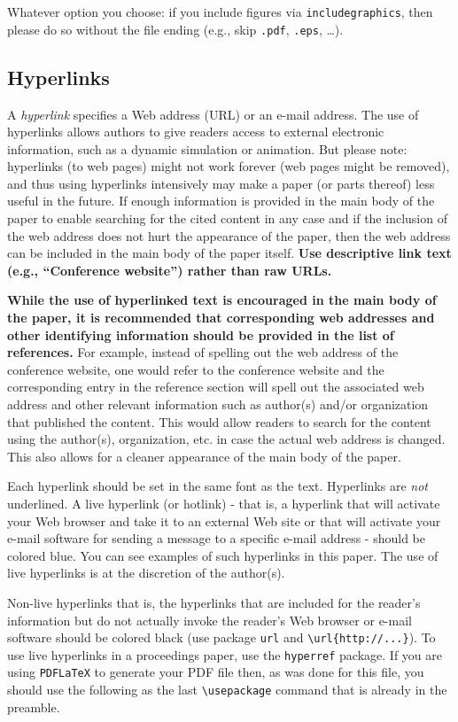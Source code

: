 \documentclass{scspaperproc}
\theoremstyle{scsthe}
\begin{document}
Whatever option you choose: if you include figures via \texttt{includegraphics}, then please do so without the file ending (e.g., skip \texttt{.pdf}, \texttt{.eps}, \ldots).

\subsection{Hyperlinks}
\label{sec:hyper}

A \emph{hyperlink} specifies a Web address (URL) or an e-mail address. The use of hyperlinks allows authors to give readers access to external electronic information, such as a dynamic simulation or animation. 
But please note: hyperlinks (to web pages) might not work forever (web pages might be removed), and thus using hyperlinks intensively may make a paper (or parts thereof) less useful in the future. If enough information is provided in the main body of the paper to enable searching for the cited content in any case and if the inclusion of the web address does not hurt the appearance of the paper, then the web address can be included in the main body of the paper itself. \textbf{Use descriptive link text (e.g., ``Conference website'') rather than raw URLs.}

\textbf{While the use of hyperlinked text is encouraged in the main body of the paper, it is recommended that corresponding web addresses and other identifying information should be provided in the list of references.} For example, instead of spelling out the web address of the conference website, one would refer to the conference website and the corresponding entry in the reference section will spell out the associated web address and other relevant information such as author(s) and/or organization that published the content. This would allow readers to search for the content using the author(s), organization, etc. in case the actual web address is changed. This also allows for a cleaner appearance of the main body of the paper.

Each hyperlink should be set in the same font as the text. Hyperlinks are \emph{not} underlined. A live hyperlink (or hotlink) - that is, a hyperlink that will activate your Web browser and take it to an external Web site or that will activate your e-mail software for sending a message to a specific e-mail address - should be colored blue. You can see examples of such hyperlinks in this paper. The use of live hyperlinks is at the discretion of the author(s).

Non-live hyperlinks that is, the hyperlinks that are included for the reader’s information but do not actually invoke the reader’s Web browser or e-mail software should be colored black (use package \texttt{url} and \verb+\url{http://...}+). To use live hyperlinks in a proceedings paper, use the \texttt{hyperref} package. If you are using \texttt{PDFLaTeX} to generate your PDF file then, as was done for this file, you should use the following as the last \verb+\usepackage+ command that is already in the preamble.
\end{document}

